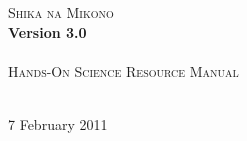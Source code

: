 \begin{titlepage}
\begin{center}
	\textsc{{\Huge Shika na Mikono}}\\[0.4cm]
	\textbf{{\huge Version 3.0}}\\[1.5cm]
	\HRule\\[0.4cm]
	\textsc{{\Large Hands-On Science Resource Manual}}\\[0.4cm]
	\HRule\\[0.5cm]
\end{center}

\vfill
\begin{center}
	{\large 7 February 2011}
\end{center}
\end{titlepage}
